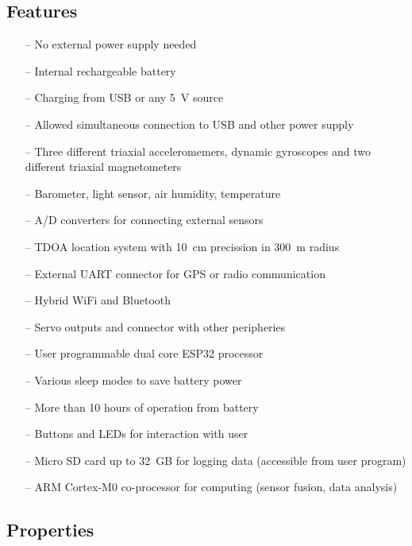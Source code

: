 \subsection{Features}
\begin{itemize}
	\setlength\itemsep{0.2em}
	\item[--] No external power supply needed
	\item[--] Internal rechargeable battery
	\item[--] Charging from \ac{USB} or any \SI{5}{V} source
	\item[--] Allowed simultaneous connection to \ac{USB} and other power supply
	\item[--] Three different triaxial acceleromemers, dynamic gyroscopes and two different triaxial magnetometers
	\item[--] Barometer, light sensor, air humidity, temperature
	\item[--] A/D converters for connecting external sensors
	\item[--] TDOA location system with \SI{10}{cm} precission in \SI{300}{m} radius
	\item[--] External UART connector for GPS or radio communication
	\item[--] Hybrid WiFi and Bluetooth
	\item[--] Servo outputs and connector with other peripheries
	\item[--] User programmable dual core ESP32 processor
	\item[--] Various sleep modes to save battery power
	\item[--] More than 10 hours of operation from battery
	\item[--] Buttons and LEDs for interaction with user
	\item[--] Micro SD card up to \SI{32}{GB} for logging data (accessible from user program)
	\item[--] ARM Cortex-M0 co-processor for computing (sensor fusion, data analysis)
\end{itemize}

\subsection{Properties}


